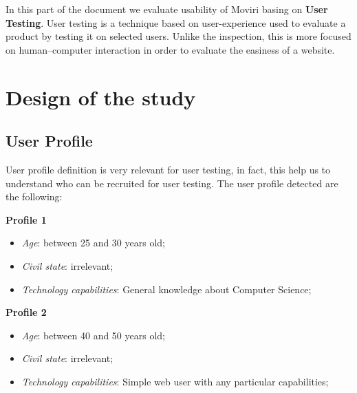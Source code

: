 In this part of the document we evaluate usability of Moviri basing on \textbf{User Testing}. User testing is a technique based on user-experience used to evaluate a product by testing it on selected users. Unlike the inspection, this is more focused on human–computer interaction in order to evaluate the easiness of a website.

\section{Design of the study}
\subsection{User Profile}
User profile definition is very relevant for user testing, in fact, this help us to understand who can be recruited for user testing. The user profile detected are the following:

\medskip
\textbf{Profile 1}\par
\begin{itemize}
\item \textit{Age}: between 25 and 30 years old;
\item \textit{Civil state}: irrelevant;
\item \textit{Technology capabilities}: General knowledge about Computer Science;
\end{itemize}

\medskip
\textbf{Profile 2}\par
\begin{itemize}
\item \textit{Age}: between 40 and 50 years old;
\item \textit{Civil state}: irrelevant;
\item \textit{Technology capabilities}: Simple web user with any particular capabilities;
\end{itemize}

